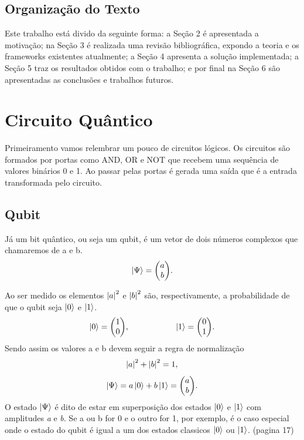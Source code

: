 \documentclass[a4paper, 12pt, oneside]{book}
\begin{document}
\section{Organização do Texto}

Este trabalho está divido da seguinte forma: a Seção 2 é apresentada a motivação; na Seção 3 é realizada uma revisão bibliográfica, expondo a teoria e os frameworks existentes atualmente; a Seção 4 apresenta a solução implementada; a Seção 5 traz os resultados obtidos com o trabalho; e por final na Seção 6 são apresentadas as conclusões e trabalhos futuros.


\chapter{Circuito Quântico}

Primeiramento vamos relembrar um pouco de circuitos lógicos. Os circuitos são formados por portas como AND, OR e NOT que recebem uma sequência de valores binários 0 e 1. Ao passar pelas portas é gerada uma saída que é a entrada transformada pelo circuito.

\section{Qubit}
Já um bit quântico, ou seja um qubit, é um vetor de dois números complexos que chamaremos de a e b.
\begin{equation} \label{eq1} 
\ket{\Psi} = \mqty(a\\b).
\end{equation}

Ao ser medido os elementos $\abs{a}^2$ e $\abs{b}^2$ são, respectivamente, a probabilidade de que o qubit seja $\ket{0}$ e $\ket{1}$. 
\begin{equation} \label{eq2}
  \ket{0} = \mqty(1\\0) ,\hspace{2cm} 
  \ket{1} = \mqty(0\\1).
\end{equation}
Sendo assim os valores a e b devem seguir a regra de normalização
\begin{equation}\label{eq3}
\abs{a}^2 + \abs{b}^2 = 1,
\end{equation}
\begin{equation}\label{eq4}
\ket{\Psi} = a\ket{0} + b\ket{1} = \mqty(a\\b).
\end{equation}
O estado $\ket{\Psi}$ é dito de estar em superposição dos estados $\ket{0}$ e $\ket{1}$ com amplitudes \textit{a} e \textit{b}. Se a ou b for 0 e o outro for 1, por exemplo, é o caso especial onde o estado do qubit é igual a um dos estados classicos $\ket{0}$ ou $\ket{1}$. (pagina 17)
\end{document}
